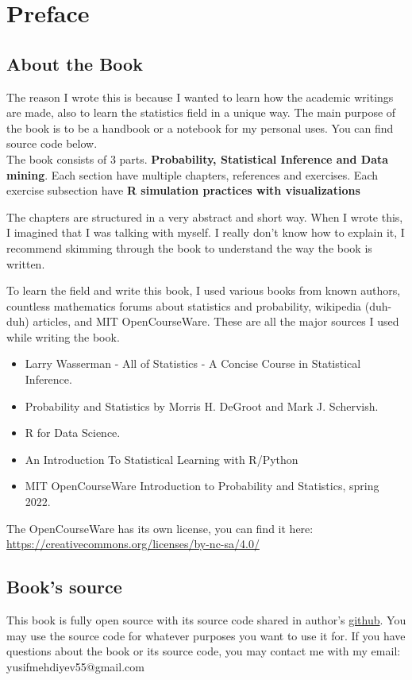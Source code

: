 \chapter*{Preface}

\section*{About the Book}
The reason I wrote this is because I wanted to learn how the academic writings are made, also to learn the statistics field in a unique way. The main purpose of the book is to be a handbook or a notebook for my personal uses. You can find source code below.\\
The book consists of $3$ parts. \textbf{Probability, Statistical Inference and Data mining}. Each section have multiple chapters, references and exercises. Each exercise subsection have \textbf{R simulation practices with visualizations}
\par
The chapters are structured in a very abstract and short way. When I wrote this, I imagined that I was talking with myself. I really don't know how to explain it, I recommend skimming through the book to understand the way the book is written.
\par
To learn the field and write this book, I used various books from known authors, countless mathematics forums about statistics and probability, wikipedia (duh-duh) articles, and MIT OpenCourseWare. These are all the major sources I used while writing the book.
\begin{itemize}
    \item Larry Wasserman - All of Statistics - A Concise Course in Statistical Inference.
    \item Probability and Statistics by Morris H. DeGroot and Mark J. Schervish.
    \item R for Data Science.
    \item An Introduction To Statistical Learning with R/Python

    \item MIT OpenCourseWare Introduction to Probability and Statistics, spring 2022.
\end{itemize}

The OpenCourseWare has its own license, you can find it here: \url{https://creativecommons.org/licenses/by-nc-sa/4.0/}


\section*{Book's source}
This book is fully open source with its source code shared in author's \href{https://github.com/JosephMehdiyev}{github}. You may use the source code for whatever purposes you want to use it for. If you have questions about the book or its source code, you may contact me with my email: yusifmehdiyev55@gmail.com 
